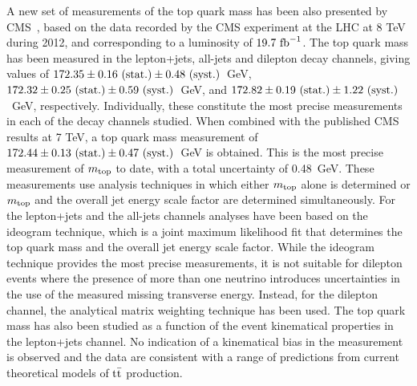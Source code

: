 \documentclass{blois}
\begin{document}
A new set of measurements of the top quark mass has been also presented by
CMS~\cite{ref:CMS-topMass8TeV}, based on the data recorded by the CMS experiment
at the LHC at 8 TeV during 2012, and corresponding to a luminosity of
$19.7~{\rm fb}^{-1}$. The top quark mass has been measured in the lepton+jets,
all-jets and dilepton decay channels, giving values of
$172.35 \pm 0.16~({\rm stat.}) \pm 0.48~({\rm syst.})$~GeV,
$172.32 \pm 0.25~({\rm stat.}) \pm 0.59~({\rm syst.})$~GeV, and
$172.82 \pm 0.19~({\rm stat.}) \pm 1.22~({\rm syst.})$~GeV, respectively.
Individually, these constitute the most precise measurements in each of the
decay channels studied. When combined with the published CMS results at 7 TeV,
a top quark mass measurement of
$172.44 \pm 0.13~({\rm stat.}) \pm 0.47~({\rm syst.})$~GeV is obtained. This is
the most precise measurement of $m_{\rm top}$ to date, with a total uncertainty
of 0.48~GeV. These measurements use analysis techniques in which either
$m_{\rm top}$ alone is determined or $m_{\rm top}$ and the overall jet energy
scale factor are determined simultaneously. For the lepton+jets and the all-jets
channels analyses have been based on the ideogram technique, which is a joint
maximum likelihood fit that determines the top quark mass and the overall jet
energy scale factor.
While the ideogram technique provides the most precise measurements, it is not
suitable for dilepton events where the presence of more than one neutrino
introduces uncertainties in the use of the measured missing transverse energy.
Instead, for the dilepton channel, the analytical matrix weighting technique
has been used.
The top quark mass has also been studied as a function of the event
kinematical properties in the lepton+jets channel. No indication of a kinematical
bias in the measurement is observed and the data are consistent with a range of
predictions from current theoretical models of ${\rm t{\bar t}}$ production.
\end{document}
